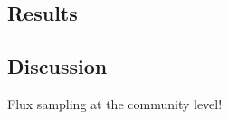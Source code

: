 \subsection{Results}

\subsection{Discussion}

   Flux sampling at the community level!












   









